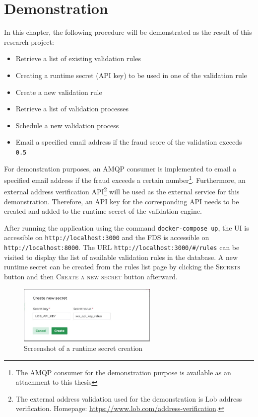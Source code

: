\section{Demonstration}

  In this chapter, the following procedure will be demonstrated as the result of this research project:

  \begin{itemize}
   \item Retrieve a list of existing validation rules
   \item Creating a runtime secret (API key) to be used in one of the validation rule 
   \item Create a new validation rule
   \item Retrieve a list of validation processes
   \item Schedule a new validation process
   \item Email a specified email address if the fraud score of the validation exceeds \verb;0.5;
  \end{itemize}

  For demonstration purposes, an AMQP consumer is implemented to email a specified email address if the fraud exceeds a certain number\footnote{The AMQP consumer for the demonstration purpose is available as an attachment to this thesis}. Furthermore, an external address verification API\footnote{The external address validation used for the demonstration is Lob address verification. Homepage: \url{https://www.lob.com/address-verification}.} will be used as the external service for this demonstration. Therefore, an API key for the corresponding API needs to be created and added to the runtime secret of the validation engine. 

  After running the application using the command \verb;docker-compose up;, the UI is accessible on \verb;http://localhost:3000; and the FDS is accessible on \verb;http://localhost:8000;. The URL \verb;http://localhost:3000/#/rules; can be visited to display the list of available validation rules in the database. A new runtime secret can be created from the rules list page by clicking the \textsc{Secrets} button and then \textsc{Create a new secret} button afterward. 

  \begin{figure}[!ht]
   \centering
   \includegraphics[width=0.6\textwidth]{images/create_secret.jpeg}
   \caption{Screenshot of a runtime secret creation}
  \end{figure}

